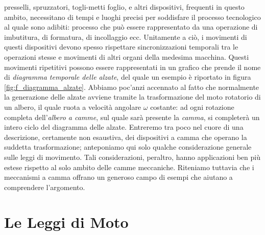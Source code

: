presselli, spruzzatori, togli-metti foglio, e altri dispositivi, frequenti in 
questo ambito, necessitano di tempi e luoghi precisi per  soddisfare il processo
tecnologico al quale sono adibiti: processo che pu\`o essere rappresentato da una operazione di imbutitura, di
formatura, di incollaggio ecc. Unitamente a ci\`o, i movimenti di questi
dispositivi devono spesso 
rispettare
sincronizzazioni temporali tra le operazioni stesse e
movimenti di altri organi della medesima macchina.
Questi movimenti ripetitivi possono essere rappresentati in un grafico che prende
il nome di {\em diagramma temporale delle alzate}, del quale un esempio \`e riportato in
figura \ref{fig:f_diagramma_alzate}.
Abbiamo poc'anzi accennato al fatto che normalmente 
la generazione delle alzate avviene tramite la trasformazione del moto
rotatorio di un albero, il quale ruota
a velocit\`a angolare  $\omega$ costante: ad ogni rotazione
completa dell'{\em albero a camme},
sul quale sar\`a presente la {\em camma}, si completer\`a un intero ciclo del diagramma delle alzate.
Entreremo tra poco nel cuore di una 
descrizione, certamente non esaustiva, dei dispositivi a camma che operano la suddetta trasformazione;
anteponiamo qui solo qualche considerazione generale sulle leggi di movimento.
Tali considerazioni, peraltro, hanno applicazioni ben pi\`u estese rispetto al solo ambito delle camme meccaniche.
Riteniamo tuttavia che i meccanismi a camma offrano un generoso campo di
esempi che aiutano a comprendere l'argomento.

\section{Le Leggi di Moto}

